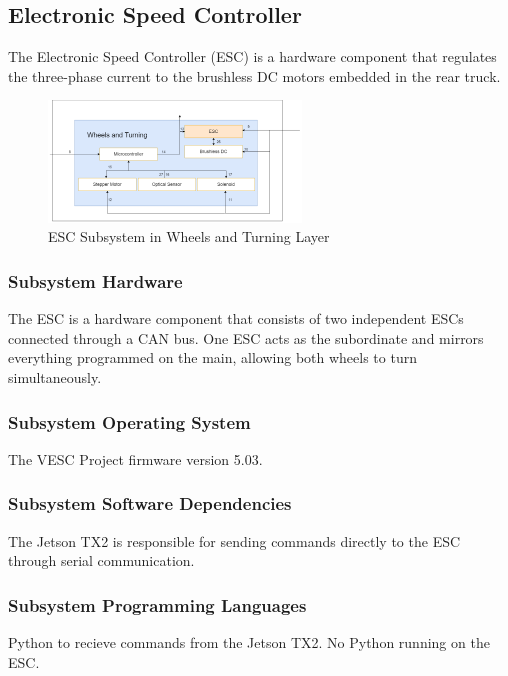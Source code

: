 \subsection{Electronic Speed Controller}
The Electronic Speed Controller (ESC) is a hardware component that regulates the three-phase current to the brushless DC motors embedded in the rear truck.

\begin{figure}[h!]
	\centering
 	\includegraphics[width=0.60\textwidth]{images/Keaton/ESC.png}
 \caption{ESC Subsystem in Wheels and Turning Layer}
\end{figure}

\subsubsection{Subsystem Hardware}
The ESC is a hardware component that consists of two independent ESCs connected through a CAN bus. One ESC acts as the subordinate and mirrors everything programmed on the main, allowing both wheels to turn simultaneously.

\subsubsection{Subsystem Operating System}
The VESC Project firmware version 5.03.

\subsubsection{Subsystem Software Dependencies}
The Jetson TX2 is responsible for sending commands directly to the ESC through serial communication.

\subsubsection{Subsystem Programming Languages}
Python to recieve commands from the Jetson TX2. No Python running on the ESC.

